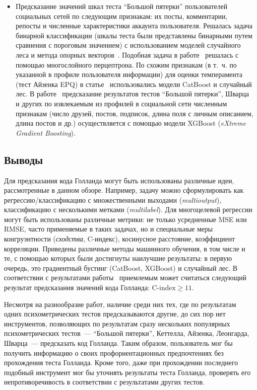 \begin{itemize}
    \item Предсказание значений шкал теста \enquote{Большой пятерки} пользователей социальных сетей по следующим признакам: их посты, комментарии, репосты и численные характеристики аккаунта пользователя. Решалась задача бинарной классификации (шкалы теста были представлены бинарными путем сравнения с пороговым значением) с использованием моделей случайного леса и метода опорных векторов~\cite{Stankevich}. Подобная задача в работе~\cite{Basaran} решалась с помощью многослойного перцептрона. По схожим признакам (в т.~ч. по указанной в профиле пользователя информации) для оценки темперамента (тест Айзенка EPQ) в статье~\cite{Oliseenko} использовались модели CatBoost и случайный лес. В работе~\cite{Titov} предсказание результатов тестов \enquote{Большой пятерки}, Шварца и других по извлекаемым из профилей в социальной сети численным признакам (число друзей, постов, подписок, длина поля с личным описанием, длина постов и др.) осуществляется с помощью модели XGBoost (\emph{eXtreme Gradient Boosting}).
\end{itemize}

\subsection{Выводы}

Для предсказания кода Голланда могут быть использованы различные идеи, рассмотренные в данном обзоре. Например, задачу можно сформулировать как регрессию/классификацию с множественными выходами (\emph{multioutput}), классификацию с несколькими метками (\emph{multilabel}). Для многоцелевой регрессии могут быть использованы различные метрики: не только усредненные MSE или RMSE, часто применяемые в таких задачах, но и специальные меры конгруэнтности (\textit{сходства}, C-индекс), косинусное расстояние, коэффициент корреляции. Приведены различные методы машинного обучения, в том числе и те, с помощью которых были достигнуты наилучшие результаты: в первую очередь, это градиентный бустинг (CatBoost, XGBoost) и случайный лес. В соответствии с результатами работы~\cite{Bogacheva} приемлемым может считаться следующий результат предсказания значений кода Голланда: $\text{C‑index} \geq 11$.

Несмотря на разнообразие работ, наличие среди них тех, где по результатам одних психометрических тестов предсказываются другие, до сих пор нет инструментов, позволяющих по результатам сразу нескольких популярных психометрических тестов~--- \enquote{Большой пятерки}, Кеттелла, Айзенка, Леонгарда, Шварца~--- предсказать код Голланда. Таким образом, пользователь мог бы получить информацию о своих профориентационных предпочтениях без прохождения теста Голланда. Кроме того, даже при прохождении последнего подобный инструмент мог бы уточнять результаты теста Голланда, проверять его непротиворечивость в соответствии с результатами других тестов.

